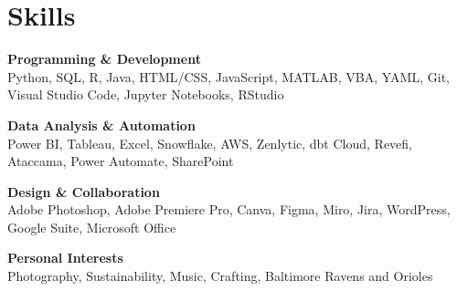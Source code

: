 \documentclass[a4paper,10pt]{article}
\newcommand{\tag}[1]{%
  \tikz[baseline]\node[anchor=base,draw=body!30,rounded corners,inner xsep=1ex,inner ysep =0.75ex,text height=1.5ex,text depth=.25ex]{#1};
}
\begin{document}


\section{Skills}
\begin{multicols}{2}
\textbf{Programming \& Development} \\
Python, SQL, R, Java, HTML/CSS, JavaScript, MATLAB, VBA, YAML, Git, Visual Studio Code, Jupyter Notebooks, RStudio

\columnbreak

\textbf{Data Analysis \& Automation} \\
Power BI, Tableau, Excel, Snowflake, AWS, Zenlytic, dbt Cloud, Revefi, Ataccama, Power Automate, SharePoint
\end{multicols}

\begin{multicols}{2}
\textbf{Design \& Collaboration} \\
Adobe Photoshop, Adobe Premiere Pro, Canva, Figma, Miro, Jira, WordPress, Google Suite, Microsoft Office

\columnbreak

\textbf{Personal Interests} \\
Photography, Sustainability, Music, Crafting, Baltimore Ravens and Orioles
\end{multicols}


\end{document}
